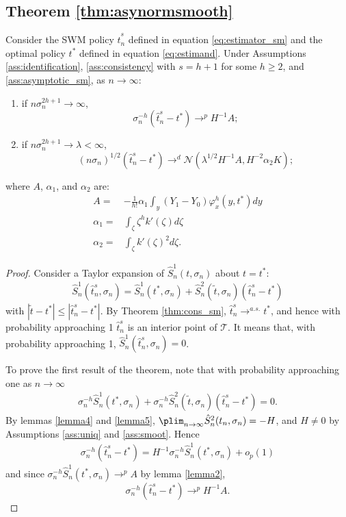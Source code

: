 {\subsection*{Theorem \ref{thm:asynormsmooth}}
\setcounter{thm}{3}
\begin{thm} 
    Consider the SWM policy $\hat{t}^s_n$ defined in equation \eqref{eq:estimator_sm} and the optimal policy $t^*$ defined in equation \eqref{eq:estimand}. Under Assumptions \ref{ass:identification}, \ref{ass:consistency} with $s=h + 1$ for some $h\geq 2$, and \ref{ass:asymptotic_sm}, as $n \rightarrow \infty$:
    \begin{enumerate}
        \item if $n \sigma_n^{2h + 1} \rightarrow \infty$, $$\sigma_n^{-h}(\hat{t}^s_n - t^*) \rightarrow^p H^{-1}A;$$
        \item  if $n \sigma_n^{2h + 1} \rightarrow \lambda < \infty$, $$(n\sigma_n)^{1/2}(\hat{t}^s_n - t^*) \rightarrow^d \mathcal{N}(\lambda^{1/2}H^{-1}A, H^{-2}\alpha_2 K);$$
    \end{enumerate}
    where $A$, $\alpha_1$, and $\alpha_2$ are:
    \begin{align}
    A =& -\frac{1}{h!} \alpha_1 \int_y \left(Y_1 - Y_0 \right) \varphi^{h}_x(y,t^*) d y \\
    \alpha_1 =& \int_\zeta \zeta^h k'\left(\zeta \right) d \zeta \\
    \alpha_2 =& \int_\zeta k'\left(\zeta \right)^2 d \zeta.
    \end{align}
\end{thm}
\begin{proof}
    Consider a Taylor expansion of $\hat{S}^1_n(t,\sigma_n)$ about $t=t^*$:
    \begin{gather}
        \hat{S}^1_n(\hat{t}^s_n,\sigma_n) = \hat{S}^1_n(t^*,\sigma_n) + \hat{S}^2_n(\tilde{t},\sigma_n) (\hat{t}^s_n - t^*)
    \end{gather}
    with $|\tilde{t}-t^*| \leq |\hat{t}^s_n - t^*|$. By Theorem \ref{thm:cons_sm}, $\hat{t}^s_n \rightarrow^{a.s.} t^*$, and hence with probability approaching 1 $\hat{t}^s_n$ is an interior point of $\mathcal{T}$. It means that, with probability approaching 1, $\hat{S}^1_n(\hat{t}^s_n,\sigma_n) = 0$.

    To prove the first result of the theorem, note that with probability approaching one as $n \rightarrow \infty$
    \begin{gather}
        \sigma_n^{-h} \hat{S}^1_n(t^*,\sigma_n) + \sigma_n^{-h} \hat{S}^2_n(\tilde{t},\sigma_n) (\hat{t}^s_n - t^*) = 0.
    \end{gather}
    By lemmas \ref{lemma4} and \ref{lemma5}, $\plim_{n \rightarrow \infty} \hat{S}^2_n(t_n,\sigma_n) =- H$, and $H \neq 0$ by Assumptions \ref{ass:uniq} and \ref{ass:smoot}. Hence
    \begin{gather}
        \sigma_n^{-h}(\hat{t}^s_n - t^*) = H^{-1} \sigma_n^{-h} \hat{S}^1_n(t^*,\sigma_n) + o_p(1)
    \end{gather}
    and since $\sigma_n^{-h} \hat{S}^1_n(t^*,\sigma_n) \rightarrow^p A$ by lemma \ref{lemma2}, $$\sigma_n^{-h}(\hat{t}^s_n - t^*) \rightarrow^p H^{-1}A.$$


\end{proof}}
